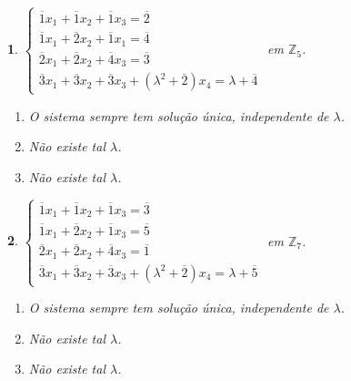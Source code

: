 \documentclass[12pt]{exam}
\newtheorem{exercicio}{}
\newcommand{\integer}{\mathbb{Z}}
\begin{document}
\begin{exercicio}
$\begin{cases}
  \overline{1}x_1 + \overline{1}x_2 + \overline{1}x_3= \overline{2}\\
  \overline{1}x_1 + \overline{2}x_2 + \overline{1}x_1 = \overline{4}\\
  \overline{2}x_1 + \overline{2}x_2 + \overline{4}x_3 = \overline{3}\\
  \overline{3}x_1 + \overline{3}x_2 + \overline{3}x_3 + (\lambda^2 + \overline{2})x_4 = \lambda + \overline{4}
\end{cases}$ em $\integer_5$.
\begin{solucao}
  \begin{enumerate}[label={\alph*})]
    \item O sistema sempre tem solu\c{c}\~ao \'unica, independente de $\lambda$.
    \item N\~ao existe tal $\lambda$.
    \item N\~ao existe tal $\lambda$.
  \end{enumerate}
\end{solucao}
\end{exercicio}

\begin{exercicio}
$\begin{cases}
  \overline{1}x_1 + \overline{1}x_2 + \overline{1}x_3 = \overline{3}\\
  \overline{1}x_1 + \overline{2}x_2 + \overline{1}x_3 = \overline{5}\\
  \overline{2}x_1 + \overline{2}x_2 + \overline{4}x_3 = \overline{1}\\
  \overline{3}x_1 + \overline{3}x_2 + \overline{3}x_3 + (\lambda^2 + \overline{2})x_4 = \lambda + \overline{5}
\end{cases}$ em $\integer_7$.
\begin{solucao}
  \begin{enumerate}[label={\alph*})]
    \item O sistema sempre tem solu\c{c}\~ao \'unica, independente de $\lambda$.
    \item N\~ao existe tal $\lambda$.
    \item N\~ao existe tal $\lambda$.
  \end{enumerate}
\end{solucao}
\end{exercicio}
\end{document}

